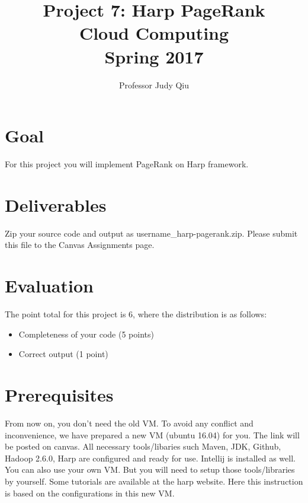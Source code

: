 \documentclass{article}
\begin{document}
\title{Project 7: Harp PageRank\\ Cloud Computing\\ Spring 2017}         %
\author{Professor Judy Qiu }        %
\date{}
\maketitle
\makeatother     %
\pagestyle{plain}
\section*{Goal}
For this project you will implement PageRank on Harp\cite{Harp} framework.

\section*{Deliverables}
Zip your source code and output as username\_harp-pagerank.zip. Please submit this file to the Canvas Assignments page.

\section*{Evaluation}
The point total for this project is 6, where the distribution is as follows:
\begin{itemize}
\item Completeness of your code (5 points)
\item Correct output (1 point)
\end{itemize}

\section*{Prerequisites}
From now on, you don't need the old VM. To avoid any conflict and inconvenience, we have prepared a new VM (ubuntu 16.04) for you. The link will be posted on canvas. All necessary tools/libaries such Maven, JDK, Github, Hadoop 2.6.0, Harp are configured and ready for use. Intellij is installed as well. You can also use your own VM. But you will need to setup those tools/libraries by yourself. Some tutorials are available at the harp website\cite{Harp}. Here this instruction is based on the configurations in this new VM.
\end{document}
